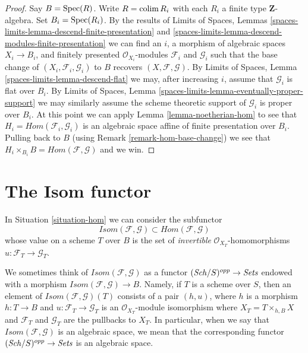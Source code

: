 \begin{proof}
\medskip\noindent
Say $B = \mathop{\mathrm{Spec}}(R)$. Write $R = \mathop{\mathrm{colim}}\nolimits R_i$ with each $R_i$ a finite
type $\mathbf{Z}$-algebra. Set $B_i = \mathop{\mathrm{Spec}}(R_i)$. By the results of
Limits of Spaces, Lemmas
\ref{spaces-limits-lemma-descend-finite-presentation} and
\ref{spaces-limits-lemma-descend-modules-finite-presentation}
we can find an $i$, a morphism of algebraic spaces $X_i \to B_i$,
and finitely presented $\mathcal{O}_{X_i}$-modules $\mathcal{F}_i$ and
$\mathcal{G}_i$ such that the base change of
$(X_i, \mathcal{F}_i, \mathcal{G}_i)$ to $B$ recovers
$(X, \mathcal{F}, \mathcal{G})$. By
Limits of Spaces, Lemma \ref{spaces-limits-lemma-descend-flat}
we may, after increasing $i$, assume that $\mathcal{G}_i$
is flat over $B_i$. By
Limits of Spaces, Lemma \ref{spaces-limits-lemma-eventually-proper-support}
we may similarly assume the scheme theoretic support of $\mathcal{G}_i$
is proper over $B_i$. At this point we can apply
Lemma \ref{lemma-noetherian-hom}
to see that $H_i = \mathit{Hom}(\mathcal{F}_i, \mathcal{G}_i)$ is
an algebraic space affine of finite presentation over $B_i$.
Pulling back to $B$ (using Remark \ref{remark-hom-base-change})
we see that $H_i \times_{B_i} B = \mathit{Hom}(\mathcal{F}, \mathcal{G})$ 
and we win.
\end{proof}






\section{The Isom functor}
\label{section-isom}

\noindent
In Situation \ref{situation-hom} we can consider the subfunctor
$$
\mathit{Isom}(\mathcal{F}, \mathcal{G}) \subset
\mathit{Hom}(\mathcal{F}, \mathcal{G})
$$
whose value on a scheme $T$ over $B$ is the set of {\it invertible}
$\mathcal{O}_{X_T}$-homomorphisms $u : \mathcal{F}_T \to \mathcal{G}_T$.

\medskip\noindent
We sometimes think of
$\mathit{Isom}(\mathcal{F}, \mathcal{G})$ as a functor
$(\mathit{Sch}/S)^{opp} \to \textit{Sets}$
endowed with a morphism
$\mathit{Isom}(\mathcal{F}, \mathcal{G}) \to B$.
Namely, if $T$ is a scheme over $S$, then an element of
$\mathit{Isom}(\mathcal{F}, \mathcal{G})(T)$ consists of a pair
$(h, u)$, where $h$ is a morphism $h : T \to B$ and
$u : \mathcal{F}_T \to \mathcal{G}_T$ is an $\mathcal{O}_{X_T}$-module
isomorphism
where $X_T = T \times_{h, B} X$ and $\mathcal{F}_T$ and $\mathcal{G}_T$
are the pullbacks to $X_T$. In particular, when we say
that $\mathit{Isom}(\mathcal{F}, \mathcal{G})$ is an algebraic space,
we mean that the corresponding functor
$(\mathit{Sch}/S)^{opp} \to \textit{Sets}$ is an algebraic space.

